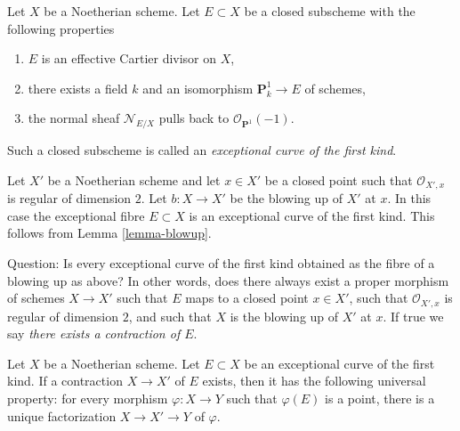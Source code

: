 \noindent
Let $X$ be a Noetherian scheme. Let $E \subset X$ be a closed
subscheme with the following properties
\begin{enumerate}
\item $E$ is an effective Cartier divisor on $X$,
\item there exists a field $k$ and an isomorphism $\mathbf{P}^1_k \to E$
of schemes,
\item the normal sheaf $\mathcal{N}_{E/X}$ pulls back to
$\mathcal{O}_{\mathbf{P}^1}(-1)$.
\end{enumerate}
Such a closed subscheme is called an {\it exceptional curve of the first kind}.

\medskip\noindent
Let $X'$ be a Noetherian scheme and let $x \in X'$ be a closed point
such that $\mathcal{O}_{X', x}$ is regular of dimension $2$. Let
$b : X \to X'$ be the blowing up of $X'$ at $x$. In this case the
exceptional fibre $E \subset X$ is an exceptional curve of the first
kind. This follows from Lemma \ref{lemma-blowup}.

\medskip\noindent
Question: Is every exceptional curve of the first kind obtained
as the fibre of a blowing up as above? In other words, does there
always exist a proper morphism of schemes $X \to X'$ such that
$E$ maps to a closed point $x \in X'$, such that $\mathcal{O}_{X', x}$
is regular of dimension $2$, and such that $X$ is the blowing up
of $X'$ at $x$. If true we say {\it there exists a contraction of $E$}.

\begin{lemma}
\label{lemma-factor-through-contraction}
Let $X$ be a Noetherian scheme. Let $E \subset X$ be an
exceptional curve of the first kind. If a contraction $X \to X'$
of $E$ exists, then it has the following universal property:
for every morphism $\varphi : X \to Y$ such that $\varphi(E)$
is a point, there is a unique factorization
$X \to X' \to Y$ of $\varphi$.
\end{lemma}

